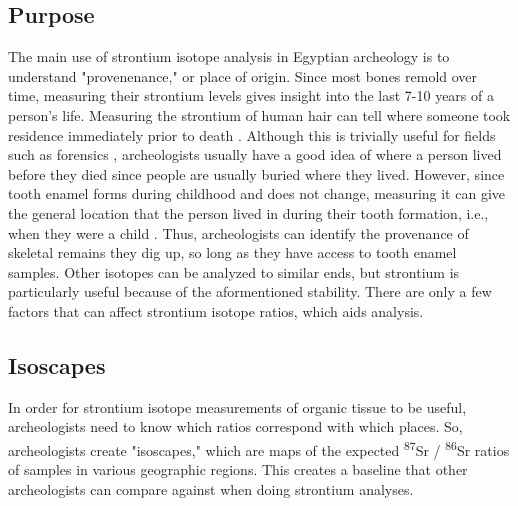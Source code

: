 \documentclass[a4paper, 12pt]{article}
\begin{document}

\subsection{Purpose}
The main use of strontium isotope analysis in Egyptian archeology is to understand
"provenenance," or place of origin. Since most bones remold over time, measuring their
strontium levels gives insight into the last 7-10
years of a person's life. Measuring the strontium of human hair can tell where someone
took residence immediately prior to death \citep{kamenov2014}. Although this is trivially useful for fields such as forensics \citep{kamenov2014},
archeologists usually have a good idea of where a person lived before they died
since people are usually buried where they lived. However, since tooth enamel
forms during childhood and does not change, measuring it can give the general location
that the person lived in during their tooth formation, i.e., when they were a child
\citep*{holt2021,kozieradzkaogunmakin2021,lazzerini2021}. Thus, archeologists can
identify the provenance of skeletal remains they dig up, so long as they have access
to tooth enamel samples. Other isotopes can be analyzed to similar ends, but
strontium is particularly useful because of the aformentioned stability. There are only
a few factors that can affect strontium isotope ratios, which aids analysis.

\subsection{Isoscapes}
In order for strontium isotope measurements of organic tissue to be useful, archeologists need to know
which ratios correspond with which places.
So, archeologists create "isoscapes," which are maps of the expected
\textsuperscript{87}Sr / \textsuperscript{86}Sr ratios
of samples in various geographic regions. This creates a baseline that other archeologists
can compare against when doing strontium analyses.
\end{document}
